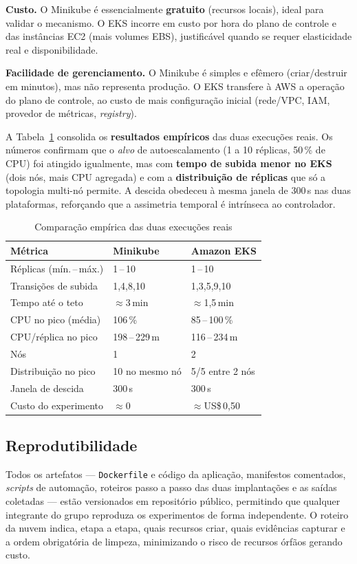 \documentclass[conference]{IEEEtran}
\begin{document}
\textbf{Custo.} O Minikube é essencialmente \textbf{gratuito} (recursos locais), ideal para
validar o mecanismo. O EKS incorre em custo por hora do plano de controle e das instâncias EC2
(mais volumes EBS), justificável quando se requer elasticidade real e disponibilidade.

\textbf{Facilidade de gerenciamento.} O Minikube é simples e efêmero (criar/destruir em minutos),
mas não representa produção. O EKS transfere à AWS a operação do plano de controle, ao custo de
mais configuração inicial (rede/VPC, IAM, provedor de métricas, \textit{registry}).

A Tabela~\ref{tab:emp} consolida os \textbf{resultados empíricos} das duas execuções reais. Os
números confirmam que o \emph{alvo} de autoescalamento (1 a 10 réplicas, 50\,\% de CPU) foi
atingido igualmente, mas com \textbf{tempo de subida menor no EKS} (dois nós, mais CPU agregada) e
com a \textbf{distribuição de réplicas} que só a topologia multi-nó permite. A descida obedeceu à
mesma janela de 300\,s nas duas plataformas, reforçando que a assimetria temporal é intrínseca ao
controlador.

\begin{table}[!t]
\caption{Comparação empírica das duas execuções reais}
\label{tab:emp}
\centering
\footnotesize
\begin{tabular}{@{}p{2.6cm}p{2.0cm}p{2.0cm}@{}}
\toprule
\textbf{Métrica} & \textbf{Minikube} & \textbf{Amazon EKS} \\
\midrule
Réplicas (mín.\,--\,máx.) & 1\,--\,10 & 1\,--\,10 \\
Transições de subida & 1,4,8,10 & 1,3,5,9,10 \\
Tempo até o teto & $\approx$3\,min & $\approx$1,5\,min \\
CPU no pico (média) & 106\,\% & 85\,--\,100\,\% \\
CPU/réplica no pico & 198\,--\,229\,m & 116\,--\,234\,m \\
Nós & 1 & 2 \\
Distribuição no pico & 10 no mesmo nó & 5/5 entre 2 nós \\
Janela de descida & 300\,s & 300\,s \\
Custo do experimento & $\approx$0 & $\approx$US\$\,0,50 \\
\bottomrule
\end{tabular}
\end{table}

\subsection*{Reprodutibilidade}
Todos os artefatos --- \texttt{Dockerfile} e código da aplicação, manifestos comentados,
\textit{scripts} de automação, roteiros passo a passo das duas implantações e as saídas coletadas
--- estão versionados em repositório público, permitindo que qualquer integrante do grupo
reproduza os experimentos de forma independente. O roteiro da nuvem indica, etapa a etapa, quais
recursos criar, quais evidências capturar e a ordem obrigatória de limpeza, minimizando o risco de
recursos órfãos gerando custo.
\end{document}
